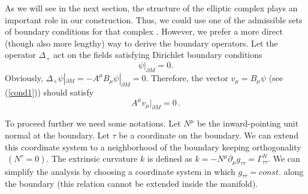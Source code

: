 \documentclass[a4paper,12pt]{article}
\newcommand{\oB}{|_{\partial M}}
\begin{document}
As we will see in the next section, the structure of the elliptic
complex plays an important role in our construction. Thus,
we could use one of the admissible sets of boundary conditions
for that complex \cite{Gilkey95}. However, we prefer a more
direct (though also more lengthy) way to derive the boundary
operators. Let the operator $\Delta_+$ act on the
fields satisfying Dirichlet boundary conditions 
\begin{equation}
\psi\oB =0. \label{Dirbc}
\end{equation}
Obviously, $\Delta_+\psi\oB =-A^\mu B_\mu \psi\oB =0$.
Therefore, the vector $v_\mu =B_\mu \psi$ (see (\ref{cond1}))
should satisfy
\begin{equation}
A^\mu v_\mu \oB =0\,.
\label{bcv}
\end{equation} 

To proceed further we need some notations. Let $N^\mu$ be the 
inward-pointing unit normal at the boundary. Let $\tau$ be a coordinate
on the boundary. We can extend this coordinate system to a
neighborhood of the boundary keeping orthogonality $~(N^\tau =0)$.
The extrinsic curvature $k$ is defined as $k=-N^\mu \partial_\mu g_{\tau\tau}
=\Gamma^N_{\tau\tau}$. We can simplify the analysis by choosing 
a coordinate system in which
$g_{\tau\tau}=const.$ along the boundary (this relation cannot be
extended inside the manifold). 
\end{document}
